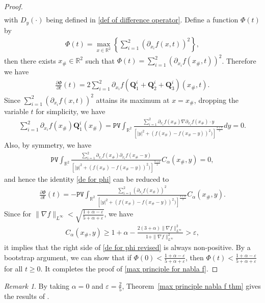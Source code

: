 \documentclass[reqno]{amsart}%
\theoremstyle{definition}
\theoremstyle{remark}
\newtheorem{rem}[thm]{Remark}
\numberwithin{equation}{section}
\newcommand{\0}{\mathbf{0}}
\newcommand{\1}{\mathbf{1}}
\newcommand{\R}{\mathbb R}
\newcommand{\PV}{\texttt{PV}}
\numberwithin{equation}{section}
\numberwithin{theorem}{section}
\numberwithin{figure}{section}
\begin{document}
\begin{proof}
\begin{align*}
\end{align*}
with $D_y(\cdot)$ being defined in \eqref{def of difference operator}. Define a function $\Phi(t)$ by
\begin{align}\label{def of phi}
\Phi(t)=\max_{x\in\R^2}\left\{\sum_{i=1}^2(\partial_{x_i}f(x,t))^2\right\},
\end{align}
then there exists $x_{\#}\in\R^2$ such that $\Phi(t)=\sum_{i=1}^2(\partial_{x_i}f(x_{\#},t))^2$. Therefore we have
\begin{align}\label{de for phi}
\frac{\partial\Phi}{\partial t}(t)=2\sum_{i=1}^2\partial_{x_i}f(\mathbf{Q}^{i}_1+\mathbf{Q}^{i}_2+\mathbf{Q}^{i}_3)(x_{\#},t).
\end{align}
Since $\sum_{i=1}^2(\partial_{x_i}f(x,t))^2$ attains its maximum at $x=x_{\#}$, dropping the variable $t$ for simplicity, we have 
\begin{align*}
\sum_{i=1}^2\partial_{x_i}f(x_{\#})\mathbf{Q}^{i}_1(x_\#)=\PV\int_{\R^2}\frac{\sum_{i=1}^2\partial_{x_i}f(x_{\#})\nabla\partial_{x_i}f(x_{\#})\cdot y}{[|y|^2+(f(x_{\#})-f(x_{\#}-y))^2)]^\frac{3+\alpha}{2}}dy=0.
\end{align*}
Also, by symmetry, we have
\begin{align*}
\PV\int_{\R^2}\frac{\sum_{i=1}^2\partial_{x_i}f(x_{\#})\partial_{x_i}f(x_{\#}-y)}{[|y|^2+(f(x_{\#})-f(x_{\#}-y))^2)]^\frac{3+\alpha}{2}}C_{\alpha}(x_{\#},y)=0,
\end{align*}
and hence the identity \eqref{de for phi} can be reduced to
\begin{align}\label{de for phi revised}
\frac{\partial\Phi}{\partial t}(t)=-\PV\int_{\R^2}\frac{\sum_{i=1}^2(\partial_{x_i}f(x_{\#}))^2}{[|y|^2+(f(x_{\#})-f(x_{\#}-y))^2)]^\frac{3+\alpha}{2}}C_{\alpha}(x_{\#},y).
\end{align}
Since for $\|\nabla f\|_{L^\infty}<\sqrt{\frac{1+\alpha-\varepsilon}{5+\alpha+\varepsilon}}$, we have
\begin{align}\label{bound on C(x,y)}
C_{\alpha}(x_{\#},y)\ge 1+\alpha-\frac{2(3+\alpha)\|\nabla f\|^2_{L^\infty}}{1+\|\nabla f\|^2_{L^\infty}}>\varepsilon,
\end{align}
it implies that the right side of \eqref{de for phi revised} is always non-positive. By a bootstrap argument, we can show that if $\Phi(0)<\frac{1+\alpha-\varepsilon}{5+\alpha+\varepsilon}$, then $\Phi(t)<\frac{1+\alpha-\varepsilon}{5+\alpha+\varepsilon}$ for all $t\ge0$. It completes the proof of \eqref{max principle for nabla f}.
\end{proof}
\begin{rem}
By taking $\alpha=0$ and $\varepsilon=\frac{2}{5}$, Theorem~\ref{max principle nabla f thm} gives the results of \cite[Theorem~4.1]{constantin2016muskat}.
\end{rem}
\end{document}
